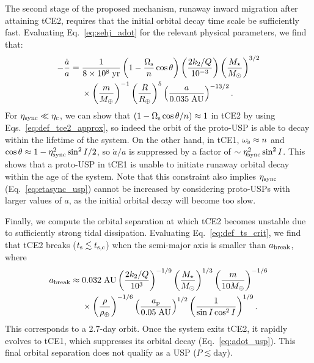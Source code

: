 \documentclass[
        fleqn,
        usenatbib,
    ]{mnras}
\newcommand*{\p}[1]{\left(#1\right)}
\begin{document}
The second stage of the proposed mechanism, runaway inward migration after
attaining tCE2, requires that the initial orbital decay time scale be
sufficiently fast. Evaluating Eq.~\eqref{eq:sehj_adot} for the relevant physical
parameters, we find that:
\begin{align}
    -\frac{\dot{a}}{a} ={}& \frac{1}{8 \times 10^8\;\mathrm{yr}}
            \p{1 - \frac{\Omega_{\rm s}}{n}\cos \theta}
            \p{\frac{2k_2/Q}{10^{-3}}}
            \p{\frac{M_\star}{M_{\odot}}}^{3/2}\nonumber\\
        &\times \p{\frac{m}{M_{\oplus}}}^{-1}
            \p{\frac{R}{R_{\oplus}}}^5
            \p{\frac{a}{0.035\;\mathrm{AU}}}^{-13/2}.
            \label{eq:adot_usp}
\end{align}
For $\eta_{\rm sync} \ll \eta_{\rm c}$, we can show that $\p{1 - \Omega_{\rm
s}\cos \theta / n} \approx 1$ in tCE2 by using Eqs.~\eqref{eq:def_tce2_approx},
so indeed the orbit of the proto-USP is able to decay within the lifetime of the
system. On the other hand, in tCE1, $\omega_{\rm s} \approx n$ and $\cos \theta
\approx 1 - \eta_{\rm sync}^2 \sin^2 I / 2$, so $\dot{a} / a$ is suppressed by a
factor of $\sim \eta_{\rm sync}^2 \sin^2 I$. This shows that a proto-USP in tCE1
is unable to initiate runaway orbital decay within the age of the system.
Note that this constraint also implies $\eta_{\rm sync}$
(Eq.~\ref{eq:etasync_usp}) cannot be increased by considering proto-USPs with
larger values of $a$, as the initial orbital decay will become too slow.

Finally, we compute the orbital separation at which tCE2 becomes unstable due to
sufficiently strong tidal dissipation. Evaluating Eq.~\eqref{eq:def_ts_crit}, we
find that tCE2 breaks ($t_{\rm s} \lesssim t_{\rm s, c}$) when the semi-major
axis is smaller than $a_{\rm break}$, where
\begin{align}
    a_{\rm break} \approx{}& 0.032 \;\mathrm{AU}
        \p{\frac{2k_2/Q}{10^{3}}}^{-1/9}
        \p{\frac{M_\star}{M_{\odot}}}^{1/3}
        \p{\frac{m}{10M_{\oplus}}}^{-1/6}\nonumber\\
        &\times \p{\frac{\rho}{\rho_{\oplus}}}^{-1/6}
        \p{\frac{a_{\rm p}}{0.05\;\mathrm{AU}}}^{1/2}
        \p{\frac{1}{\sin I \cos^2 I}}^{1/9}.
\end{align}
This corresponds to a 2.7-day orbit. Once the system exits tCE2, it rapidly
evolves to tCE1, which suppresses its orbital decay (Eq.~\ref{eq:adot_usp}).
This final orbital separation does not qualify as a USP ($P \lesssim
\mathrm{day}$).
\end{document}
